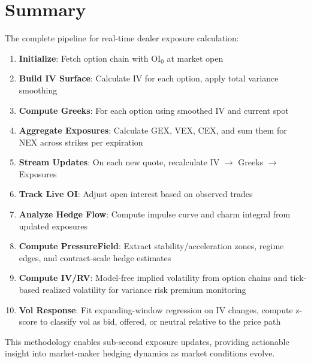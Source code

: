 \documentclass[11pt, a4paper]{article}
\begin{document}
\section{Summary}

The complete pipeline for real-time dealer exposure calculation:

\begin{enumerate}
    \item \textbf{Initialize}: Fetch option chain with $\text{OI}_0$ at market open
    \item \textbf{Build IV Surface}: Calculate IV for each option, apply total variance smoothing
    \item \textbf{Compute Greeks}: For each option using smoothed IV and current spot
    \item \textbf{Aggregate Exposures}: Calculate GEX, VEX, CEX, and sum them for NEX across strikes per expiration
    \item \textbf{Stream Updates}: On each new quote, recalculate IV $\rightarrow$ Greeks $\rightarrow$ Exposures
    \item \textbf{Track Live OI}: Adjust open interest based on observed trades
    \item \textbf{Analyze Hedge Flow}: Compute impulse curve and charm integral from updated exposures
    \item \textbf{Compute PressureField}: Extract stability/acceleration zones, regime edges, and contract-scale hedge estimates
    \item \textbf{Compute IV/RV}: Model-free implied volatility from option chains and tick-based realized volatility for variance risk premium monitoring
    \item \textbf{Vol Response}: Fit expanding-window regression on IV changes, compute z-score to classify vol as bid, offered, or neutral relative to the price path
\end{enumerate}

This methodology enables sub-second exposure updates, providing actionable insight into market-maker hedging dynamics as market conditions evolve.
\end{document}
